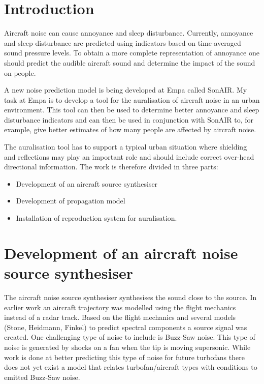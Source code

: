 \section*{Introduction}
Aircraft noise can cause annoyance and sleep disturbance. Currently, annoyance 
and sleep disturbance are predicted using indicators based on time-averaged sound pressure 
levels. To obtain a more complete representation of annoyance one should 
predict the audible aircraft sound and determine the impact of the sound on people.

A new noise prediction model is being developed at Empa called SonAIR. 
My task at Empa is to develop a tool for the auralisation of aircraft noise in 
an urban environment. This tool can then be used to determine better annoyance 
and sleep disturbance indicators and can then be used in conjunction with 
SonAIR to, for example, give better estimates of how many people are affected by 
aircraft noise.

The auralisation tool has to support a typical urban situation where shielding 
and reflections may play an important role and should include correct over-head 
directional information. The work is therefore divided in three parts:

\begin{itemize}
 \item Development of an aircraft source synthesiser
 \item Development of propagation model
 \item Installation of reproduction system for auralisation.
 \end{itemize}


\section*{Development of an aircraft noise source synthesiser}
The aircraft noise source synthesiser synthesises the sound close to the source.
In earlier work \cite{Arntzen2011} an aircraft trajectory was modelled using the 
flight mechanics instead of a radar track.
Based on the flight mechanics and several models (Stone, Heidmann, Finkel) to 
predict spectral components a source signal was created.
One challenging type of noise to include is Buzz-Saw noise. This type of noise 
is generated by shocks on a fan when the tip is moving supersonic. 
While work is done at better predicting this type of noise for future turbofans 
\cite{McAlpine2007} there does not yet exist a model that relates 
turbofan/aircraft types with conditions to emitted Buzz-Saw noise.

